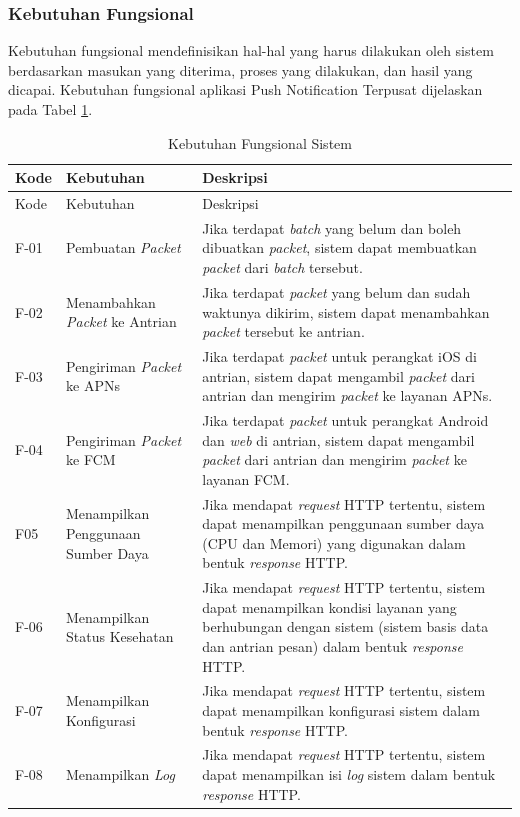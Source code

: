 \subsubsection{Kebutuhan Fungsional}
\par Kebutuhan fungsional mendefinisikan hal-hal yang harus dilakukan oleh sistem berdasarkan masukan yang diterima, proses yang dilakukan, dan hasil yang dicapai. Kebutuhan fungsional aplikasi Push Notification Terpusat dijelaskan pada Tabel \ref{t:fungsional}.
\begin{longtable}{|p{1cm}|p{3cm}|p{5cm}|}
    \caption{Kebutuhan Fungsional Sistem} \label{t:fungsional} \\ \hline
    \rowcolor{lightgray} Kode & {Kebutuhan} & Deskripsi \\ \hline
    \endfirsthead
    \hline
    \rowcolor{lightgray} Kode & {Kebutuhan} & Deskripsi \\ \hline
    \endhead
    F-01 & Pembuatan \textit{Packet} & Jika terdapat \textit{batch} yang belum dan boleh dibuatkan \textit{packet}, sistem dapat membuatkan \textit{packet} dari \textit{batch} tersebut. \\ \hline
    F-02 & Menambahkan \textit{Packet} ke Antrian & Jika terdapat \textit{packet} yang belum dan sudah waktunya dikirim, sistem dapat menambahkan \textit{packet} tersebut ke antrian. \\ \hline
    F-03 & Pengiriman \textit{Packet} ke APNs & Jika terdapat \textit{packet} untuk perangkat iOS di antrian, sistem dapat mengambil \textit{packet} dari antrian dan mengirim \textit{packet} ke layanan APNs. \\ \hline
    F-04 & Pengiriman \textit{Packet} ke FCM & Jika terdapat \textit{packet} untuk perangkat Android dan \textit{web} di antrian, sistem dapat mengambil \textit{packet} dari antrian dan mengirim \textit{packet} ke layanan FCM. \\ \hline
    F05 & Menampilkan Penggunaan Sumber Daya & Jika mendapat \textit{request} HTTP tertentu, sistem dapat menampilkan penggunaan sumber daya (CPU dan Memori) yang digunakan dalam bentuk \textit{response} HTTP. \\ \hline
    F-06 & Menampilkan Status Kesehatan & Jika mendapat \textit{request} HTTP tertentu, sistem dapat menampilkan kondisi layanan yang berhubungan dengan sistem (sistem basis data dan antrian pesan) dalam bentuk \textit{response} HTTP. \\ \hline
    F-07 & Menampilkan Konfigurasi & Jika mendapat \textit{request} HTTP tertentu, sistem dapat menampilkan konfigurasi sistem dalam bentuk \textit{response} HTTP. \\ \hline
    F-08 & Menampilkan \textit{Log} & Jika mendapat \textit{request} HTTP tertentu, sistem dapat menampilkan isi \textit{log} sistem dalam bentuk \textit{response} HTTP. \\ \hline
\end{longtable}

